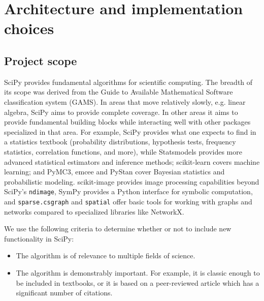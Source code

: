 \documentclass[fleqn,10pt]{wlscirep}
\begin{document}


\section*{Architecture and implementation choices}
\subsection*{Project scope}

SciPy provides fundamental algorithms for scientific computing. The
breadth of its scope was derived from the Guide to Available Mathematical
Software classification system (GAMS\cite{boisvert1991guide}). In areas
that move relatively slowly, e.g. linear algebra, SciPy aims to provide
complete coverage. In other areas it aims to provide fundamental building
blocks while interacting well with other packages specialized in that area.
For example, SciPy provides what one expects to find in a
statistics textbook (probability distributions, hypothesis tests, frequency
statistics, correlation functions, and more), while
Statsmodels\cite{statsmodels2010} provides
more advanced statistical estimators and inference methods;
scikit-learn\cite{pedregosa2011scikit} covers machine learning; and
PyMC3\cite{10.7717/peerj-cs.55}, emcee\cite{2013PASP-emcee} and
PyStan\cite{pystan-ref} cover Bayesian statistics and probabilistic modeling.
scikit-image\cite{vanderwalt2014scikit} provides image processing
capabilities beyond SciPy's \texttt{ndimage}, SymPy\cite{meurer2017sympy}
provides a Python interface for symbolic computation, and \texttt{sparse.csgraph}
and \texttt{spatial} offer basic tools
for working with graphs and networks compared to specialized
libraries like NetworkX\cite{hagberg2008networkx}.


We use the following criteria to determine whether or not to include new
functionality in SciPy:
\begin{itemize}
    \item The algorithm is of relevance to multiple fields of science.
    \item The algorithm is demonstrably important.  For example, it is classic
    enough to be included in textbooks, or it is based on a peer-reviewed article
    which has a significant number of citations.
\end{itemize}
\end{document}
